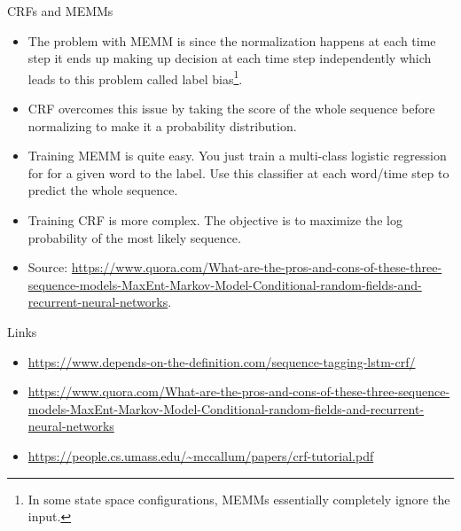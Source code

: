 \documentclass[handout]{beamer}
\begin{document}
\begin{frame}{CRFs and MEMMs}
\begin{scriptsize}

\begin{itemize}

\item  The problem with MEMM is since the normalization happens at each time step it ends up making up decision at each time step independently which leads to this problem called label bias\footnote{In some state space configurations, MEMMs essentially completely ignore the input.}.

\item CRF overcomes this issue by taking the score of the whole sequence before normalizing to make it a probability distribution.

\item Training MEMM is quite easy. You just train a multi-class logistic regression for for a given word to the label. Use this classifier at each word/time step to predict the whole sequence.

\item Training CRF is more complex. The objective  is to maximize the log probability of the most likely sequence.

\item Source: \url{https://www.quora.com/What-are-the-pros-and-cons-of-these-three-sequence-models-MaxEnt-Markov-Model-Conditional-random-fields-and-recurrent-neural-networks}.

\end{itemize}

\end{scriptsize}
\end{frame}



\begin{frame}{Links}
\begin{scriptsize}
\begin{itemize}

\item \url{https://www.depends-on-the-definition.com/sequence-tagging-lstm-crf/}

\item \url{https://www.quora.com/What-are-the-pros-and-cons-of-these-three-sequence-models-MaxEnt-Markov-Model-Conditional-random-fields-and-recurrent-neural-networks}

\item \url{https://people.cs.umass.edu/~mccallum/papers/crf-tutorial.pdf}

\end{itemize}


\end{scriptsize}
\end{frame}
\end{document}
